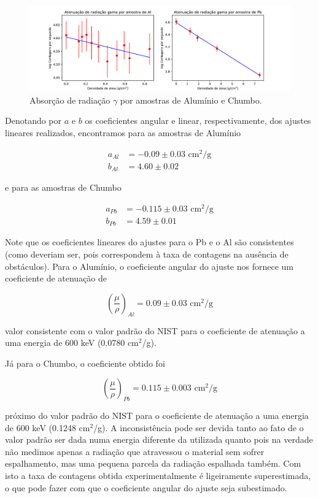 \documentclass[a4paper, 11pt, notitlepage]{article}
\numberwithin{equation}{section}  %
\begin{document}
\begin{figure}[H]
  \centering
  \includegraphics[width=1.0\textwidth]{absorcao_gamma.pdf}
  \caption{Absorção de radiação $\gamma$ por amostras de Alumínio e Chumbo.}
  \label{fig:absorcao.gamma}
\end{figure}

Denotando por $a$ e $b$ os coeficientes angular e linear, respectivamente, dos ajustes lineares realizados, encontramos para as amostras de Alumínio

\begin{align*}
a_{Al} &= -0.09 \pm 0.03 \text{ cm}^2\text{/g} \\
b_{Al} &= 4.60 \pm 0.02
\end{align*}

\noindent e para as amostras de Chumbo

\begin{align*}
a_{Pb} &= -0.115 \pm 0.03 \text{ cm}^2\text{/g} \\
b_{Pb} &= 4.59 \pm 0.01
\end{align*}

Note que os coeficientes lineares do ajustes para o Pb e o Al são consistentes (como deveriam ser, pois correspondem à taxa de contagens na ausência de obstáculos). Para o Alumínio, o coeficiente angular do ajuste nos fornece um coeficiente de atenuação de 

\[
\left(\frac{\mu}{\rho}\right)_{Al} = 0.09 \pm 0.03\text{ cm}^2\text{/g}
\]

\noindent valor consistente com o valor padrão do NIST\cite{nist_absorption} para o coeficiente de atenuação a uma energia de $600$ keV (0.0780 cm$^2$/g).

Já para o Chumbo, o coeficiente obtido foi

\[
\left(\frac{\mu}{\rho}\right)_{Pb} = 0.115 \pm 0.003\text{ cm}^2\text{/g}
\]

\noindent próximo do valor padrão do NIST\cite{nist_absorption} para o coeficiente de atenuação a uma energia de $600$ keV (0.1248 cm$^2$/g). A inconsistência pode ser devida tanto ao fato de o valor padrão ser dada numa energia diferente da utilizada quanto pois na verdade não medimos apenas a radiação que atravessou o material sem sofrer espalhamento, mas uma pequena parcela da radiação espalhada também. Com isto a taxa de contagens obtida experimentalmente é ligeiramente superestimada, o que pode fazer com que o coeficiente angular do ajuste seja subestimado.
\end{document}
